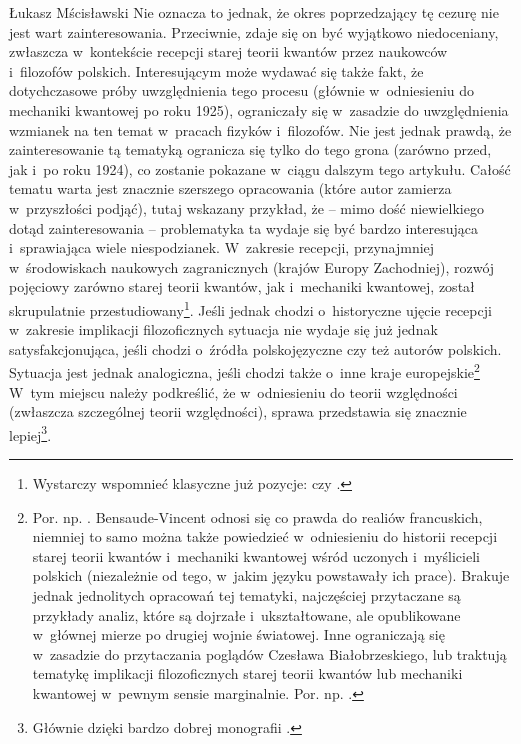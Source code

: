 \begin{artplenv}{Łukasz Mścisławski}
Nie oznacza to jednak, że okres poprzedzający tę cezurę nie jest wart zainteresowania. Przeciwnie, zdaje się on być wyjątkowo niedoceniany, zwłaszcza w~kontekście recepcji starej teorii kwantów przez naukowców i~filozofów polskich. Interesującym może wydawać się także fakt, że dotychczasowe próby uwzględnienia tego procesu (głównie w~odniesieniu do mechaniki kwantowej po roku 1925), ograniczały się w~zasadzie do uwzględnienia wzmianek na ten temat w~pracach fizyków i~filozofów. Nie jest jednak prawdą, że zainteresowanie tą tematyką ogranicza się tylko do tego grona (zarówno przed, jak i~po roku 1924), co zostanie pokazane w~ciągu dalszym tego artykułu. Całość tematu warta jest znacznie szerszego opracowania (które autor zamierza w~przyszłości podjąć), tutaj wskazany przykład, że -- mimo dość niewielkiego dotąd zainteresowania -- problematyka ta wydaje się być bardzo interesująca i~sprawiająca wiele niespodzianek. W~zakresie recepcji, przynajmniej w~środowiskach naukowych zagranicznych (krajów Europy Zachodniej), rozwój pojęciowy zarówno starej teorii kwantów, jak i~mechaniki kwantowej, został skrupulatnie przestudiowany\footnote{Wystarczy wspomnieć klasyczne już pozycje:
\parencite[][]{jammer_conceptual_1966} %
 czy 
\parencite[][]{kragh_quantum_1999}.%
}. Jeśli jednak chodzi o~historyczne ujęcie recepcji w~zakresie implikacji filozoficznych sytuacja nie wydaje się już jednak satysfakcjonująca, jeśli chodzi o~źródła polskojęzyczne czy też autorów polskich. Sytuacja jest jednak analogiczna, jeśli chodzi także o~inne kraje
europejskie\footnote{Por. np. 
\parencite[][]{bensaude-vincent_when_1988}. %
 Bensaude-Vincent odnosi się co prawda do realiów francuskich, niemniej to samo można także powiedzieć w~odniesieniu do historii recepcji starej teorii kwantów i~mechaniki kwantowej wśród uczonych i~myślicieli polskich (niezależnie od tego, w~jakim języku powstawały ich prace). Brakuje jednak jednolitych opracowań tej tematyki, najczęściej przytaczane są przykłady analiz, które są dojrzałe i~ukształtowane, ale opublikowane w~głównej mierze po drugiej wojnie światowej. Inne ograniczają się w~zasadzie do przytaczania poglądów Czesława Białobrzeskiego, lub traktują tematykę implikacji filozoficznych starej teorii kwantów lub mechaniki kwantowej w~pewnym sensie marginalnie. Por. np. 
\parencites[][]{dabrowski_o_1980}[][]{kostro_philosophie_1969}[][]{heller_krakowska_2007}[][]{heller_krakowska_2007-1}[czy][]{mscislawski_miedzy_2017}.}
% 
% 
W~tym miejscu należy podkreślić, że w~odniesieniu do teorii względności (zwłaszcza szczególnej teorii względności), sprawa przedstawia się znacznie lepiej\footnote{Głównie dzięki bardzo dobrej monografii 
\parencite[][]{polak_bylem_2012}.%
}.


\end{artplenv}
